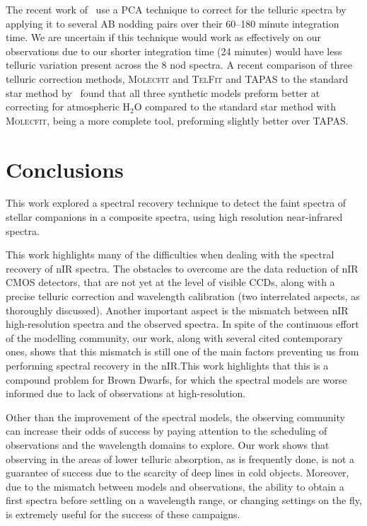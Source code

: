 \documentclass[fleqn,usenatbib]{mnras}
\newcommand*\bl{\color{blue}}
\begin{document}
    {\bl The recent work of~\citet{piskorz_evidence_2016} use a PCA technique to correct for the telluric spectra by applying it to several AB nodding pairs over their 60--180 minute integration time. We are uncertain if this technique would work as effectively on our observations due to our shorter integration time (24 minutes) would have less telluric variation present across the 8 nod spectra. A recent comparison of three telluric correction methods, \textsc{Molecfit} and \textsc{TelFit} and {TAPAS} to the standard star method by~\cite[]{ulmer-moll_telluric_2018} found that all three synthetic models preform better at correcting for atmospheric H$_2$O compared to the standard star method with \textsc{Molecfit}, being a more complete tool, preforming slightly better over TAPAS.}
    
    
    \section{Conclusions}
    \label{sec:conclusions}
    This work explored a spectral recovery technique to detect the faint spectra of stellar companions {\bl in a composite spectra}, using high resolution near-infrared spectra. 
    
    This work highlights many of the difficulties when dealing with the spectral recovery of nIR spectra. The obstacles to overcome are the data reduction of nIR CMOS detectors, that are not yet at the level of visible CCDs, along with a precise telluric correction and wavelength calibration (two interrelated aspects, as thoroughly discussed). Another important aspect is the mismatch between nIR high-resolution spectra and the observed spectra. In spite of the continuous effort of the modelling community, our work, along with several cited contemporary ones, shows that this mismatch is still one of the main factors preventing us from performing spectral recovery in the nIR.\@ This work highlights that this is a compound problem for Brown Dwarfs, for which the spectral models are worse informed due to lack of observations at high-resolution.
    
    Other than the improvement of the spectral models, the observing community can increase their odds of success by paying attention to the scheduling of observations and the wavelength domains to explore. Our work shows that observing in the areas of lower telluric absorption, as is frequently done, is not a guarantee of success due to the scarcity of deep lines in cold objects. Moreover, due to the mismatch between models and observations, the ability to obtain a first spectra before settling on a wavelength range, or changing settings on the fly, is extremely useful for the success of these campaigns.
    
\end{document}
